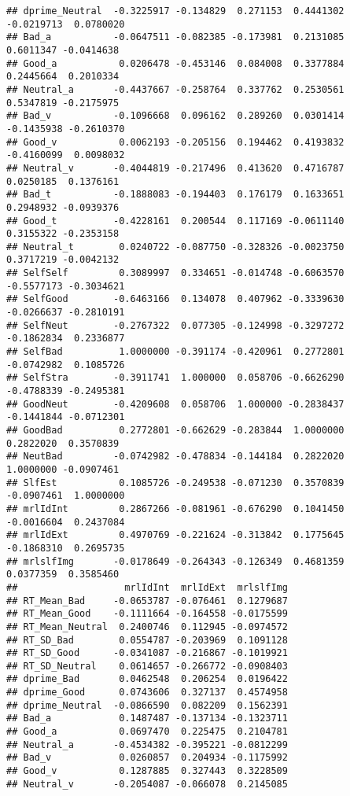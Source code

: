 \documentclass[man]{apa6}
\begin{document}
\begin{verbatim}
## dprime_Neutral  -0.3225917 -0.134829  0.271153  0.4441302 -0.0219713  0.0780020
## Bad_a           -0.0647511 -0.082385 -0.173981  0.2131085  0.6011347 -0.0414638
## Good_a           0.0206478 -0.453146  0.084008  0.3377884  0.2445664  0.2010334
## Neutral_a       -0.4437667 -0.258764  0.337762  0.2530561  0.5347819 -0.2175975
## Bad_v           -0.1096668  0.096162  0.289260  0.0301414 -0.1435938 -0.2610370
## Good_v           0.0062193 -0.205156  0.194462  0.4193832 -0.4160099  0.0098032
## Neutral_v       -0.4044819 -0.217496  0.413620  0.4716787  0.0250185  0.1376161
## Bad_t           -0.1888083 -0.194403  0.176179  0.1633651  0.2948932 -0.0939376
## Good_t          -0.4228161  0.200544  0.117169 -0.0611140  0.3155322 -0.2353158
## Neutral_t        0.0240722 -0.087750 -0.328326 -0.0023750  0.3717219 -0.0042132
## SelfSelf         0.3089997  0.334651 -0.014748 -0.6063570 -0.5577173 -0.3034621
## SelfGood        -0.6463166  0.134078  0.407962 -0.3339630 -0.0266637 -0.2810191
## SelfNeut        -0.2767322  0.077305 -0.124998 -0.3297272 -0.1862834  0.2336877
## SelfBad          1.0000000 -0.391174 -0.420961  0.2772801 -0.0742982  0.1085726
## SelfStra        -0.3911741  1.000000  0.058706 -0.6626290 -0.4788339 -0.2495381
## GoodNeut        -0.4209608  0.058706  1.000000 -0.2838437 -0.1441844 -0.0712301
## GoodBad          0.2772801 -0.662629 -0.283844  1.0000000  0.2822020  0.3570839
## NeutBad         -0.0742982 -0.478834 -0.144184  0.2822020  1.0000000 -0.0907461
## SlfEst           0.1085726 -0.249538 -0.071230  0.3570839 -0.0907461  1.0000000
## mrlIdInt         0.2867266 -0.081961 -0.676290  0.1041450 -0.0016604  0.2437084
## mrlIdExt         0.4970769 -0.221624 -0.313842  0.1775645 -0.1868310  0.2695735
## mrlslfImg       -0.0178649 -0.264343 -0.126349  0.4681359  0.0377359  0.3585460
##                   mrlIdInt  mrlIdExt  mrlslfImg
## RT_Mean_Bad     -0.0653787 -0.076461  0.1279687
## RT_Mean_Good    -0.1111664 -0.164558 -0.0175599
## RT_Mean_Neutral  0.2400746  0.112945 -0.0974572
## RT_SD_Bad        0.0554787 -0.203969  0.1091128
## RT_SD_Good      -0.0341087 -0.216867 -0.1019921
## RT_SD_Neutral    0.0614657 -0.266772 -0.0908403
## dprime_Bad       0.0462548  0.206254  0.0196422
## dprime_Good      0.0743606  0.327137  0.4574958
## dprime_Neutral  -0.0866590  0.082209  0.1562391
## Bad_a            0.1487487 -0.137134 -0.1323711
## Good_a           0.0697470  0.225475  0.2104781
## Neutral_a       -0.4534382 -0.395221 -0.0812299
## Bad_v            0.0260857  0.204934 -0.1175992
## Good_v           0.1287885  0.327443  0.3228509
## Neutral_v       -0.2054087 -0.066078  0.2145085

\end{verbatim}
\end{document}
